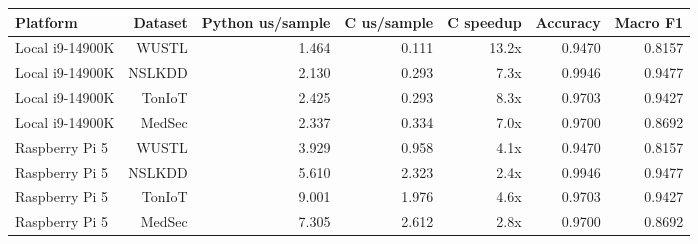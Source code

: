 \begin{tabular}{lrrrrrr}
\toprule
Platform & Dataset & Python us/sample & C us/sample & C speedup & Accuracy & Macro F1 \\
\midrule
Local i9-14900K & WUSTL & 1.464 & 0.111 & 13.2x & 0.9470 & 0.8157 \\
Local i9-14900K & NSLKDD & 2.130 & 0.293 & 7.3x & 0.9946 & 0.9477 \\
Local i9-14900K & TonIoT & 2.425 & 0.293 & 8.3x & 0.9703 & 0.9427 \\
Local i9-14900K & MedSec & 2.337 & 0.334 & 7.0x & 0.9700 & 0.8692 \\
Raspberry Pi 5 & WUSTL & 3.929 & 0.958 & 4.1x & 0.9470 & 0.8157 \\
Raspberry Pi 5 & NSLKDD & 5.610 & 2.323 & 2.4x & 0.9946 & 0.9477 \\
Raspberry Pi 5 & TonIoT & 9.001 & 1.976 & 4.6x & 0.9703 & 0.9427 \\
Raspberry Pi 5 & MedSec & 7.305 & 2.612 & 2.8x & 0.9700 & 0.8692 \\
\bottomrule
\end{tabular}
